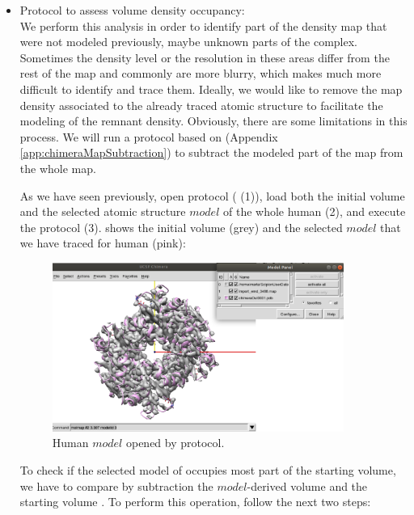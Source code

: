 \begin{itemize}
 \item Protocol  to assess volume density occupancy:\\
 
 We perform this analysis in order to identify part of the density map that were not modeled previously, maybe unknown parts of the complex. Sometimes the density level or the resolution in these areas differ from the rest of the map and commonly are more blurry, which makes much more difficult to identify and trace them. Ideally, we would like to remove the map density associated to the already traced atomic structure to facilitate the modeling of the remnant density. Obviously, there are some limitations in this process. We will run a protocol based on \chimera (Appendix \ref{app:chimeraMapSubtraction}) to subtract the modeled part of the map from the whole map.
 
 As we have seen previously, open \chimera {} protocol ( (1)), load both the initial volume and the selected atomic structure $model$ of the whole human  (2), and execute the protocol (3).  shows the initial volume  (grey) and the selected $model$ that we have traced for human  (pink):
 
 \begin{figure}[H]
    \centering 
    \captionsetup{width=.7\linewidth} 
    \includegraphics[width=0.90\textwidth]{Images/Fig42}
    \caption{Human  $model$ opened by \chimera {} protocol.}
    \label{fig:chimera_operate_vol}
   \end{figure}
 
 To check if the selected model of  occupies most part of the starting volume, we have to compare by subtraction the $model$-derived volume and the starting volume . To perform this operation, follow the next two steps:
 

\end{itemize}
